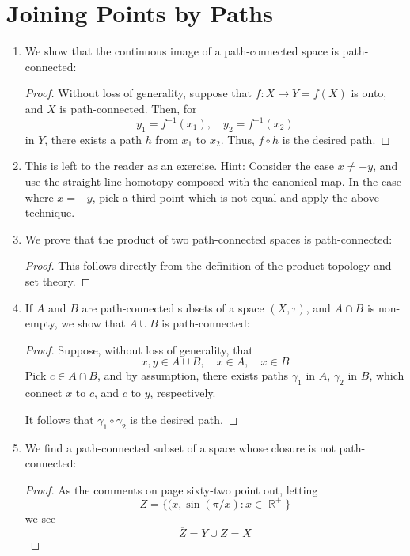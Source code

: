 \documentclass{book}
\DeclareMathOperator*{\R}{\mathbb{R}}
\begin{document}
\section{Joining Points by Paths}
\begin{enumerate}[(1)]
    \item We show that the continuous image of a path-connected space is path-connected: 
        \begin{proof} Without loss of generality, suppose that $f: X \rightarrow Y = f(X)$ is onto, and $X$ is path-connected. Then, for 
            \[y_1 = f^{-1}(x_1), \quad  y_2 = f^{-1}(x_2)\]
            in $Y$, there exists a path $h$ from $x_1$ to $x_2$. Thus, $f \circ h$ is the desired path.   
        \end{proof}

    \item This is left to the reader as an exercise. Hint: Consider the case $x \neq -y$, and use the straight-line homotopy composed with the canonical map. In the case where $x = -y$, pick a third point which is not equal and apply the above technique.  

    \item We prove that the product of two path-connected spaces is path-connected: 
        \begin{proof} This follows directly from the definition of the product topology and set theory. 
        \end{proof}

    \item If $A$ and $B$ are path-connected subsets of a space $(X, \tau)$, and $A \cap B$ is non-empty, we show that $A \cup B$ is path-connected: 
        \begin{proof} Suppose, without loss of generality, that 
            \[x,y \in A \cup B, \quad x \in A, \quad x \in B\]
            Pick $c \in A \cap B$, and by assumption, there exists paths $\gamma_1$ in $A$, $\gamma_2$ in $B$, which connect $x$ to $c$, and $c$ to $y$, respectively. 
            \par It follows that $\gamma_1 \circ \gamma_2$ is the desired path. 
        \end{proof}

    \item We find a path-connected subset of a space whose closure is not path-connected:
        \begin{proof} As the comments on page sixty-two point out, letting 
            \[Z = \{(x, \sin(\pi/x): x \in \R^+\}\]
            we see 
            \[\overline{Z} = Y \cup Z = X\]
        \end{proof}


\end{enumerate}
\end{document}
